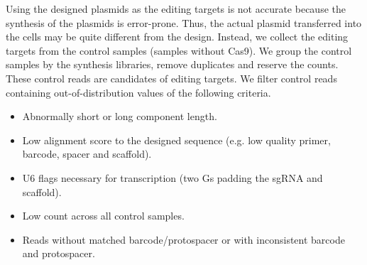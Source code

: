 \documentclass{article}
\begin{document}
Using the designed plasmids as the editing targets is not accurate because the synthesis of the plasmids is error-prone. Thus, the actual plasmid transferred into the cells may be quite different from the design. Instead, we collect the editing targets from the control samples (samples without Cas9). We group the control samples by the synthesis libraries, remove duplicates and reserve the counts. These control reads are candidates of editing targets. We filter control reads containing out-of-distribution values of the following criteria.
\begin{itemize}
  \item Abnormally short or long component length.
  \item Low alignment score to the designed sequence (e.g. low quality primer, barcode, spacer and scaffold).
  \item U6 flags necessary for transcription (two Gs padding the sgRNA and scaffold).
  \item Low count across all control samples.
  \item Reads without matched barcode/protospacer or with inconsistent barcode and protospacer.
\end{itemize}
\end{document}
